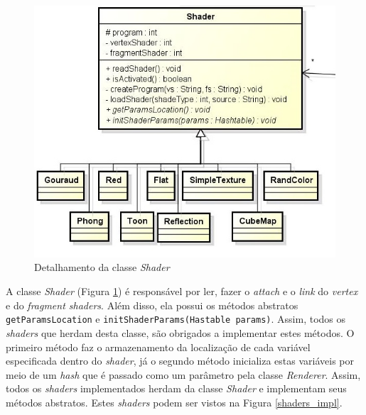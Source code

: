 	\begin{figure}[h]
	\centering
		\includegraphics[keepaspectratio=true,scale=0.6]{figuras/shaders_diag.jpg}
	\caption{Detalhamento da classe \textit{Shader}}
	\label{shaders_diag}
	\end{figure}

	A classe \textit{Shader} (Figura \ref{shaders_diag}) é responsável por ler, fazer o \textit{attach} e o \textit{link} do \textit{ vertex} e do \textit{fragment shaders}. Além disso, ela possui os métodos abstratos \texttt{getParamsLocation} e \texttt{initShaderParams(Hastable params)}. Assim, todos os \textit{shaders} que herdam desta classe, são obrigados a implementar estes métodos. O primeiro método faz o armazenamento da localização de cada variável especificada dentro do \textit{shader}, já o segundo método inicializa estas variáveis por meio de um \textit{hash} que é passado como um parâmetro pela classe \textit{Renderer}. Assim, todos os \textit{shaders} implementados herdam da classe \textit{Shader} e implementam seus métodos abstratos. Estes \textit{shaders} podem ser vistos na Figura \ref{shaders_impl}.  

